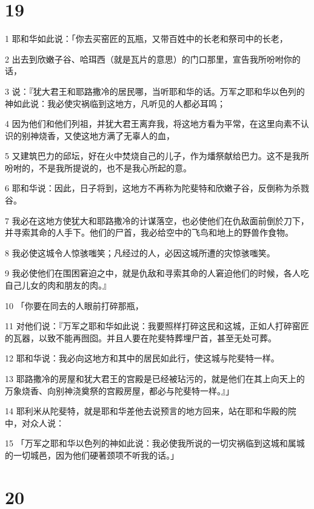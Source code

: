 \chapter{19}

\par 1 耶和华如此说：「你去买窑匠的瓦瓶，又带百姓中的长老和祭司中的长老，
\par 2 出去到欣嫩子谷、哈珥西（就是瓦片的意思）的门口那里，宣告我所吩咐你的话，
\par 3 说：『犹大君王和耶路撒冷的居民哪，当听耶和华的话。万军之耶和华以色列的神如此说：我必使灾祸临到这地方，凡听见的人都必耳鸣；
\par 4 因为他们和他们列祖，并犹大君王离弃我，将这地方看为平常，在这里向素不认识的别神烧香，又使这地方满了无辜人的血，
\par 5 又建筑巴力的邱坛，好在火中焚烧自己的儿子，作为燔祭献给巴力。这不是我所吩咐的，不是我所提说的，也不是我心所起的意。
\par 6 耶和华说：因此，日子将到，这地方不再称为陀斐特和欣嫩子谷，反倒称为杀戮谷。
\par 7 我必在这地方使犹大和耶路撒冷的计谋落空，也必使他们在仇敌面前倒於刀下，并寻索其命的人手下。他们的尸首，我必给空中的飞鸟和地上的野兽作食物。
\par 8 我必使这城令人惊骇嗤笑；凡经过的人，必因这城所遭的灾惊骇嗤笑。
\par 9 我必使他们在围困窘迫之中，就是仇敌和寻索其命的人窘迫他们的时候，各人吃自己儿女的肉和朋友的肉。』
\par 10 「你要在同去的人眼前打碎那瓶，
\par 11 对他们说：『万军之耶和华如此说：我要照样打碎这民和这城，正如人打碎窑匠的瓦器，以致不能再囫囵。并且人要在陀斐特葬埋尸首，甚至无处可葬。
\par 12 耶和华说：我必向这地方和其中的居民如此行，使这城与陀斐特一样。
\par 13 耶路撒冷的房屋和犹大君王的宫殿是已经被玷污的，就是他们在其上向天上的万象烧香、向别神浇奠祭的宫殿房屋，都必与陀斐特一样。』」
\par 14 耶利米从陀斐特，就是耶和华差他去说预言的地方回来，站在耶和华殿的院中，对众人说：
\par 15 「万军之耶和华以色列的神如此说：我必使我所说的一切灾祸临到这城和属城的一切城邑，因为他们硬著颈项不听我的话。」

\chapter{20}

